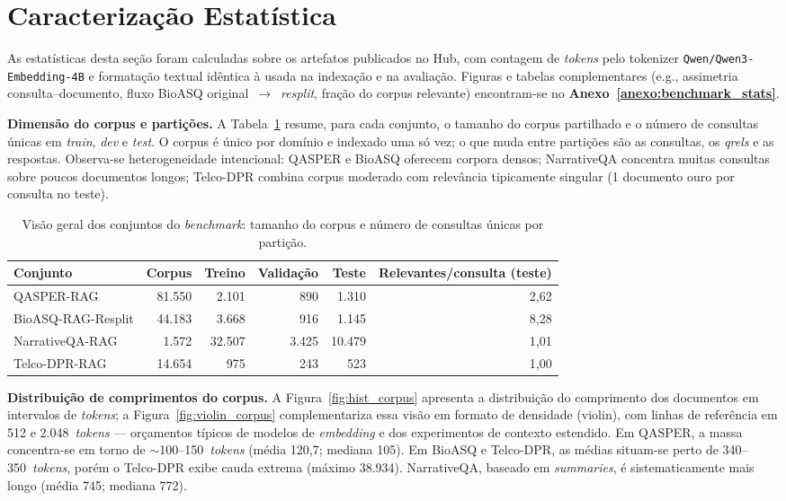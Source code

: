 \section{Caracterização Estatística}

As estatísticas desta seção foram calculadas sobre os artefatos publicados no Hub, com contagem de \textit{tokens} pelo tokenizer \texttt{Qwen/Qwen3-Embedding-4B} e formatação textual idêntica à usada na indexação e na avaliação. Figuras e tabelas complementares (e.g., assimetria consulta--documento, fluxo BioASQ original~$\rightarrow$~\textit{resplit}, fração do corpus relevante) encontram-se no \textbf{Anexo~\ref{anexo:benchmark_stats}}.

\textbf{Dimensão do corpus e partições.}
A Tabela~\ref{tab:resumo_benchmark} resume, para cada conjunto, o tamanho do corpus partilhado e o número de consultas únicas em \textit{train}, \textit{dev} e \textit{test}. O corpus é único por domínio e indexado uma só vez; o que muda entre partições são as consultas, os \textit{qrels} e as respostas. Observa-se heterogeneidade intencional: QASPER e BioASQ oferecem corpora densos; NarrativeQA concentra muitas consultas sobre poucos documentos longos; Telco-DPR combina corpus moderado com relevância tipicamente singular (1 documento ouro por consulta no teste).

\begin{table}[htbp]
\caption{Visão geral dos conjuntos do \textit{benchmark}: tamanho do corpus e número de consultas únicas por partição.}
\label{tab:resumo_benchmark}
\centering
\footnotesize
\begin{tabular}{lrrrrr}
\hline
\textbf{Conjunto} & \textbf{Corpus} & \textbf{Treino} & \textbf{Validação} & \textbf{Teste} & \textbf{Relevantes/consulta (teste)} \\ \hline
QASPER-RAG & 81.550 & 2.101 & 890 & 1.310 & 2,62 \\
BioASQ-RAG-Resplit & 44.183 & 3.668 & 916 & 1.145 & 8,28 \\
NarrativeQA-RAG & 1.572 & 32.507 & 3.425 & 10.479 & 1,01 \\
Telco-DPR-RAG & 14.654 & 975 & 243 & 523 & 1,00 \\ \hline
\end{tabular}
\end{table}

\textbf{Distribuição de comprimentos do corpus.}
A Figura~\ref{fig:hist_corpus} apresenta a distribuição do comprimento dos documentos em intervalos de \textit{tokens}; a Figura~\ref{fig:violin_corpus} complementariza essa visão em formato de densidade (violin), com linhas de referência em 512 e 2.048~\textit{tokens} --- orçamentos típicos de modelos de \textit{embedding} e dos experimentos de contexto estendido. Em QASPER, a massa concentra-se em torno de $\sim$100--150~\textit{tokens} (média 120,7; mediana 105). Em BioASQ e Telco-DPR, as médias situam-se perto de 340--350~\textit{tokens}, porém o Telco-DPR exibe cauda extrema (máximo 38.934). NarrativeQA, baseado em \textit{summaries}, é sistematicamente mais longo (média 745; mediana 772).

